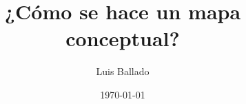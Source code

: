 \documentclass[
	11pt, %
]{beamer}
\title[SEMINARIO DE INVESTIGACIÓN I]{¿Cómo se hace un mapa conceptual?} %
\author[Luis Ballado]{Luis Ballado} %
\institute[CINVESTAV]{CINVESTAV - UNIDAD TAMAULIPAS \\ \smallskip \textit{luis.ballado@cinvestav.mx}} %
\date[\today]{\today} %
\begin{document}

\begin{frame}
	\titlepage %
\end{frame}



	


\end{document}

